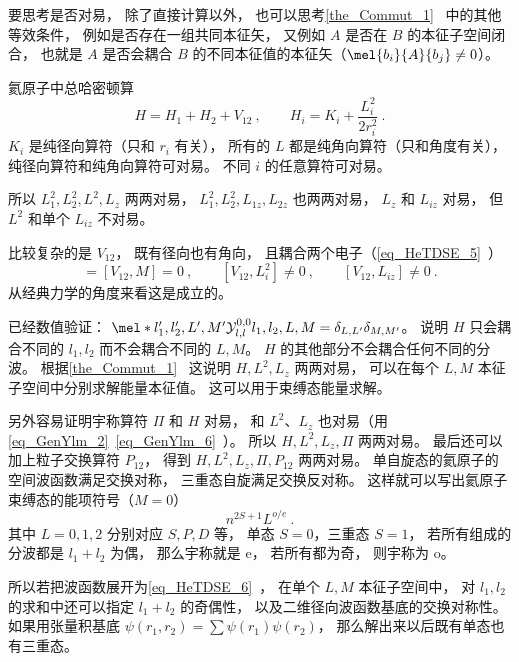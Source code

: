 
\begin{issues}
\issueDraft
\end{issues}

要思考是否对易， 除了直接计算以外， 也可以思考\autoref{the_Commut_1}~ 中的其他等效条件， 例如是否存在一组共同本征矢， 又例如 $A$ 是否在 $B$ 的本征子空间闭合， 也就是 $A$ 是否会耦合 $B$ 的不同本征值的本征矢（$\mel{b_i}{A}{b_j} \ne 0$）。

氦原子中总哈密顿算
\begin{equation}
H = H_1 + H_2 + V_{12}~,
\qquad H_i = K_i + \frac{L_i^2}{2r_i^2}~.
\end{equation}
$K_i$ 是纯径向算符（只和 $r_i$ 有关）， 所有的 $L$ 都是纯角向算符（只和角度有关）， 纯径向算符和纯角向算符可对易。 不同 $i$ 的任意算符可对易。

所以 $L_1^2, L_2^2, L^2, L_z$ 两两对易， $L_1^2, L_2^2, L_{1z}, L_{2z}$ 也两两对易， $L_z$ 和 $L_{iz}$ 对易， 但 $L^2$ 和单个 $L_{iz}$ 不对易。

比较复杂的是 $V_{12}$， 既有径向也有角向， 且耦合两个电子（\autoref{eq_HeTDSE_5}~）
\begin{equation}
[V_{12}, L^2] = [V_{12}, M] = 0~,
\qquad
[V_{12}, L_i^2] \ne 0~,
\qquad
[V_{12}, L_{iz}] \ne 0~.
\end{equation}
从经典力学的角度来看这是成立的。

已经数值验证： $\mel*{l'_1,l'_2,L',M'}{\mathcal Y_{l,l}^{0,0}}{l_1,l_2,L,M} = \delta_{L,L'}\delta_{M,M'}$。 说明 $H$ 只会耦合不同的 $l_1,l_2$ 而不会耦合不同的 $L,M$。 $H$ 的其他部分不会耦合任何不同的分波。 根据\autoref{the_Commut_1}~ 这说明 $H,L^2,L_z$ 两两对易， 可以在每个 $L,M$ 本征子空间中分别求解能量本征值。 这可以用于束缚态能量求解。

另外容易证明宇称算符 $\Pi$ 和 $H$ 对易， 和 $L^2$、$L_z$ 也对易（用\autoref{eq_GenYlm_2}~\autoref{eq_GenYlm_6}~）。 所以 $H,L^2,L_z,\Pi$ 两两对易。 最后还可以加上粒子交换算符 $P_{12}$， 得到 $H,L^2,L_z,\Pi, P_{12}$ 两两对易。 单自旋态的氦原子的空间波函数满足交换对称， 三重态自旋满足交换反对称。 这样就可以写出氦原子束缚态的能项符号（$M=0$）
\begin{equation}
n^{2S+1}L^{o/e}~.
\end{equation}
其中 $L=0,1,2$ 分别对应 $S,P,D$ 等， 单态 $S=0$，三重态 $S=1$， 若所有组成的分波都是 $l_1+l_2$ 为偶， 那么宇称就是 e， 若所有都为奇， 则宇称为 o。

所以若把波函数展开为\autoref{eq_HeTDSE_6}~， 在单个 $L,M$ 本征子空间中， 对 $l_1,l_2$ 的求和中还可以指定 $l_1+l_2$ 的奇偶性， 以及二维径向波函数基底的交换对称性。 如果用张量积基底 $\psi(r_1,r_2) = \sum \psi(r_1)\psi(r_2)$， 那么解出来以后既有单态也有三重态。
